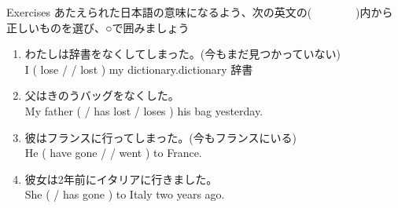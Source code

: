 \documentclass[aspectratio=169,xcolor={dvipsnames,table}]{beamer}
\newcommand{\myaudio}[1]{\href{#1}{\faVolumeUp}}
\begin{document}
\begin{frame}[plain]{Exercises}
 あたえられた日本語の意味になるよう、次の英文の(~~~~~~~~)内から正しいものを選び、○で囲みましょう%
\mbox{}\hfill{\scriptsize \myaudio{./audio/014_have_pp_kekka_05.mp3}}


\begin{enumerate}
 \item {\small わたしは辞書をなくしてしまった。}{\footnotesize (今もまだ見つかっていない)}\\
I  ( lose /  / lost ) my dictionary.\hfill{\scriptsize dictionary  辞書}
 \item {\small 父はきのうバッグをなくした。\textdbend}\\
My father (  / has lost / loses ) his bag yesterday.
 \item {\small 彼はフランスに行ってしまった。}{\footnotesize (今もフランスにいる)}\\
He ( have gone / / went  ) to France.
 \item {\small 彼女は2年前にイタリアに行きました。\textdbend}\\
She (  / has gone ) to Italy two years ago.
\end{enumerate}
\end{frame}
\end{document}
